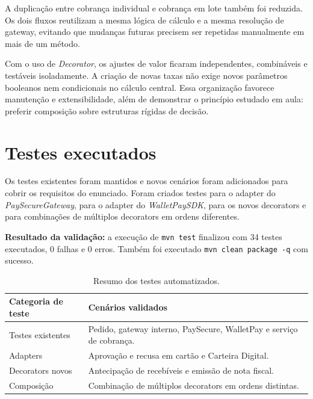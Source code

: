\documentclass[12pt,a4paper]{article}
\begin{document}
A duplicação entre cobrança individual e cobrança em lote também foi reduzida. Os dois fluxos reutilizam a mesma lógica de cálculo e a mesma resolução de gateway, evitando que mudanças futuras precisem ser repetidas manualmente em mais de um método.

Com o uso de \textit{Decorator}, os ajustes de valor ficaram independentes, combináveis e testáveis isoladamente. A criação de novas taxas não exige novos parâmetros booleanos nem condicionais no cálculo central. Essa organização favorece manutenção e extensibilidade, além de demonstrar o princípio estudado em aula: preferir composição sobre estruturas rígidas de decisão.

\section{Testes executados}

Os testes existentes foram mantidos e novos cenários foram adicionados para cobrir os requisitos do enunciado. Foram criados testes para o adapter do \textit{PaySecureGateway}, para o adapter do \textit{WalletPaySDK}, para os novos decorators e para combinações de múltiplos decorators em ordens diferentes.

\begin{resultbox}
\textbf{Resultado da validação:} a execução de \texttt{mvn test} finalizou com 34 testes executados, 0 falhas e 0 erros. Também foi executado \texttt{mvn clean package -q} com sucesso.
\end{resultbox}

\begin{table}[H]
\centering
\small
\begin{tabular}{p{}p{}}
\toprule
\textbf{Categoria de teste} & \textbf{Cenários validados} \\
\midrule
Testes existentes & Pedido, gateway interno, PaySecure, WalletPay e serviço de cobrança. \\
Adapters & Aprovação e recusa em cartão e Carteira Digital. \\
Decorators novos & Antecipação de recebíveis e emissão de nota fiscal. \\
Composição & Combinação de múltiplos decorators em ordens distintas. \\
\bottomrule
\end{tabular}
\caption{Resumo dos testes automatizados.}
\end{table}
\end{document}
